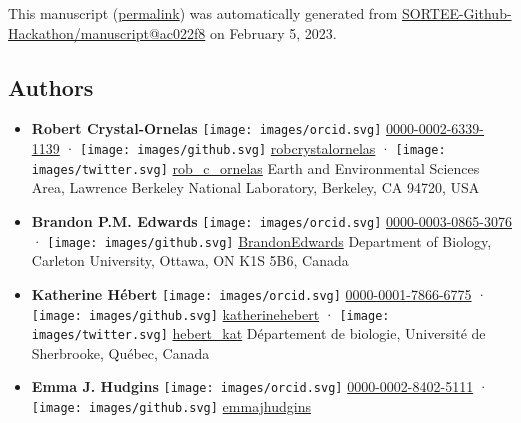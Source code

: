 This manuscript
(\href{https://SORTEE-Github-Hackathon.github.io/manuscript/v/ac022f888171bd26895e5be7f44228e72d1a32ca/}{permalink})
was automatically generated
from \href{https://github.com/SORTEE-Github-Hackathon/manuscript/tree/ac022f888171bd26895e5be7f44228e72d1a32ca}{SORTEE-Github-Hackathon/manuscript@ac022f8}
on February 5, 2023.

\hypertarget{authors}{%
\subsection{Authors}\label{authors}}

\begin{itemize}
\item
  \textbf{Robert Crystal-Ornelas}
  \texttt{[image: images/orcid.svg]}
  \href{https://orcid.org/0000-0002-6339-1139}{0000-0002-6339-1139}
  · \texttt{[image: images/github.svg]}
  \href{https://github.com/robcrystalornelas}{robcrystalornelas}
  · \texttt{[image: images/twitter.svg]}
  \href{https://twitter.com/rob_c_ornelas}{rob\_c\_ornelas}
  Earth and Environmental Sciences Area, Lawrence Berkeley National Laboratory, Berkeley, CA 94720, USA
\item
  \textbf{Brandon P.M. Edwards}
  \texttt{[image: images/orcid.svg]}
  \href{https://orcid.org/0000-0003-0865-3076}{0000-0003-0865-3076}
  · \texttt{[image: images/github.svg]}
  \href{https://github.com/BrandonEdwards}{BrandonEdwards}
  Department of Biology, Carleton University, Ottawa, ON K1S 5B6, Canada
\item
  \textbf{Katherine Hébert}
  \texttt{[image: images/orcid.svg]}
  \href{https://orcid.org/0000-0001-7866-6775}{0000-0001-7866-6775}
  · \texttt{[image: images/github.svg]}
  \href{https://github.com/katherinehebert}{katherinehebert}
  · \texttt{[image: images/twitter.svg]}
  \href{https://twitter.com/hebert_kat}{hebert\_kat}
  Département de biologie, Université de Sherbrooke, Québec, Canada
\item
  \textbf{Emma J. Hudgins}
  \texttt{[image: images/orcid.svg]}
  \href{https://orcid.org/0000-0002-8402-5111}{0000-0002-8402-5111}
  · \texttt{[image: images/github.svg]}
  \href{https://github.com/emmajhudgins}{emmajhudgins}

\end{itemize}
